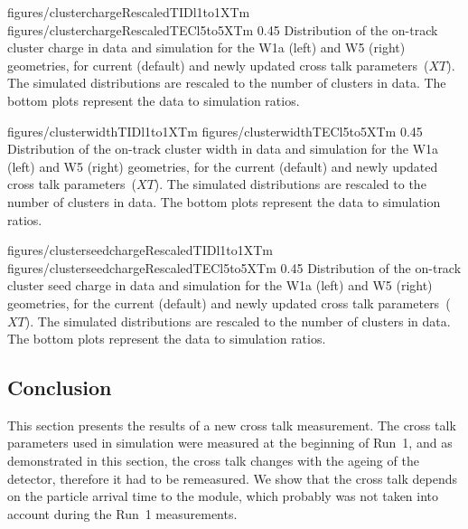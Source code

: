                  {figures/clusterchargeRescaledTIDl1to1XTm} %
                 {figures/clusterchargeRescaledTECl5to5XTm} %
                 {0.45}       %
                 { Distribution of the on-track cluster charge in data and simulation for the W1a (left) and W5 (right) geometries, for current (default) and newly updated cross talk parameters~($XT$).  The simulated distributions are rescaled to the number of clusters in data.  The bottom plots represent the data to simulation ratios. }

                 {figures/clusterwidthTIDl1to1XTm}
                 {figures/clusterwidthTECl5to5XTm}
                 {0.45}       %
                 { Distribution of the on-track cluster width in data and simulation for the W1a (left) and W5 (right) geometries, for the current (default) and newly updated cross talk parameters~($XT$).  The simulated distributions are rescaled to the number of clusters in data.  The bottom plots represent the data to simulation ratios. }

                 {figures/clusterseedchargeRescaledTIDl1to1XTm} %
                 {figures/clusterseedchargeRescaledTECl5to5XTm} %
                 {0.45}       %
                 { Distribution of the on-track cluster seed charge in data and simulation for the W1a (left) and W5 (right) geometries, for the current (default) and newly updated cross talk parameters~($XT$).  The simulated distributions are rescaled to the number of clusters in data.  The bottom plots represent the data to simulation ratios. }

\newpage

\subsection{Conclusion}

This section presents the results of a new cross talk measurement. The cross talk parameters used in simulation were measured at the beginning of Run~1, and as demonstrated in this section, the cross talk changes with the ageing of the detector, therefore it had to be remeasured. We show that the cross talk depends on the particle arrival time to the module, which probably was not taken into account during the Run~1 measurements. 

